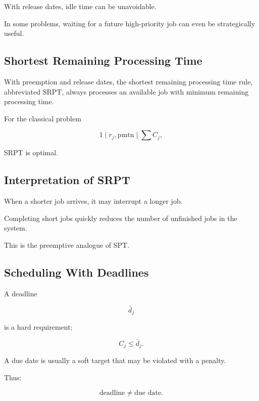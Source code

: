 With release dates, idle time can be unavoidable.

In some problems, waiting for a future high-priority job can even be
strategically useful.

\subsection{Shortest Remaining Processing Time}
\label{subsec:srpt}

With preemption and release dates, the shortest remaining processing time
rule, abbreviated SRPT, always processes an available job with minimum
remaining processing time.

For the classical problem

\[
\boxed{
1
\mid
r_j,\mathrm{pmtn}
\mid
\sum C_j,
}
\]

SRPT is optimal.

\subsection{Interpretation of SRPT}
\label{subsec:srpt-interpretation}

When a shorter job arrives, it may interrupt a longer job.

Completing short jobs quickly reduces the number of unfinished jobs in
the system.

This is the preemptive analogue of SPT.

\subsection{Scheduling With Deadlines}
\label{subsec:scheduling-deadlines}

A deadline

\[
\bar d_j
\]

is a hard requirement:

\[
\boxed{
C_j
\leq
\bar d_j.
}
\]

A due date is usually a soft target that may be violated with a penalty.

Thus:

\[
\boxed{
\text{deadline}
\neq
\text{due date}.
}
\]

